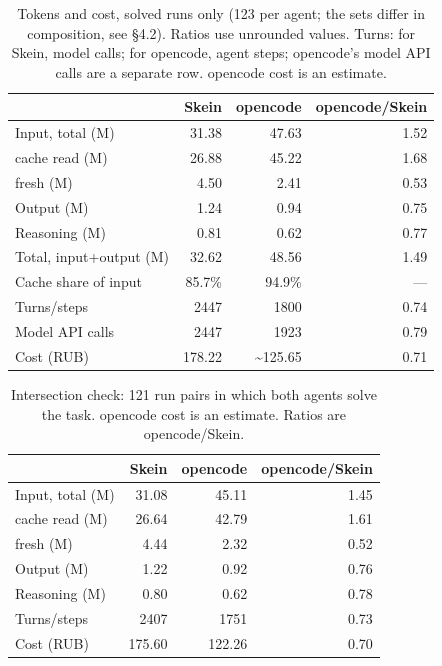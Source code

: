 \documentclass[11pt,a4paper]{article}
\begin{document}
\begin{table}[t]
\centering
\small
\caption{Tokens and cost, solved runs only (123 per agent; the sets differ in composition,
see \S4.2). Ratios use unrounded values. Turns: for Skein, model calls; for opencode, agent
steps; opencode's model API calls are a separate row. opencode cost is an estimate.}
\label{tab:tokens}
\begin{tabular}{@{}lrrr@{}}
\toprule
 & Skein & opencode & opencode/Skein \\
\midrule
Input, total (M) & 31.38 & 47.63 & 1.52 \\
\quad cache read (M) & 26.88 & 45.22 & 1.68 \\
\quad fresh (M) & 4.50 & 2.41 & 0.53 \\
Output (M) & 1.24 & 0.94 & 0.75 \\
Reasoning (M) & 0.81 & 0.62 & 0.77 \\
Total, input+output (M) & 32.62 & 48.56 & 1.49 \\
Cache share of input & 85.7\% & 94.9\% & --- \\
Turns/steps & 2447 & 1800 & 0.74 \\
Model API calls & 2447 & 1923 & 0.79 \\
Cost (RUB) & 178.22 & \textasciitilde125.65 & 0.71 \\
\bottomrule
\end{tabular}
\end{table}

\begin{table}[t]
\centering
\small
\caption{Intersection check: 121 run pairs in which both agents solve the task. opencode cost
is an estimate. Ratios are opencode/Skein.}
\label{tab:intersection}
\begin{tabular}{@{}lrrr@{}}
\toprule
 & Skein & opencode & opencode/Skein \\
\midrule
Input, total (M) & 31.08 & 45.11 & 1.45 \\
\quad cache read (M) & 26.64 & 42.79 & 1.61 \\
\quad fresh (M) & 4.44 & 2.32 & 0.52 \\
Output (M) & 1.22 & 0.92 & 0.76 \\
Reasoning (M) & 0.80 & 0.62 & 0.78 \\
Turns/steps & 2407 & 1751 & 0.73 \\
Cost (RUB) & 175.60 & 122.26 & 0.70 \\
\bottomrule
\end{tabular}
\end{table}
\end{document}
